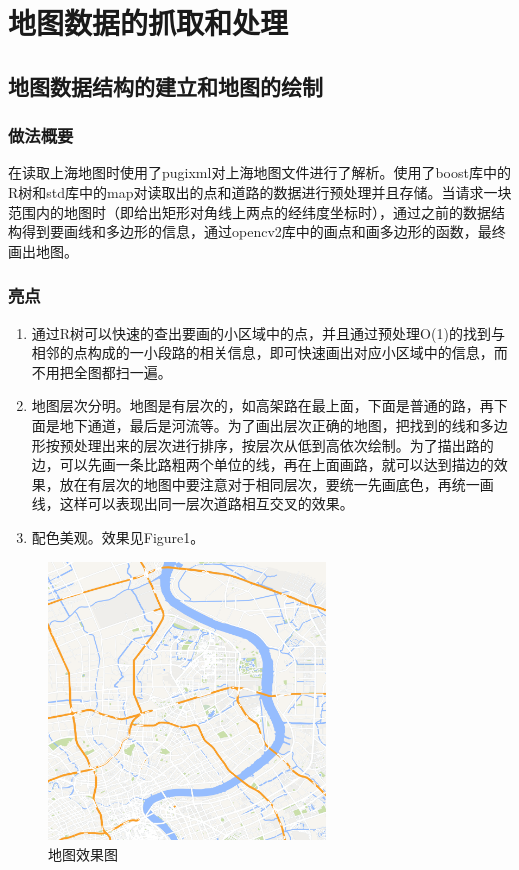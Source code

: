 \documentclass[10pt]{scrartcl}
\begin{document}
\section{地图数据的抓取和处理}
\subsection{地图数据结构的建立和地图的绘制}

\subsubsection{做法概要}
在读取上海地图时使用了pugixml对上海地图文件进行了解析。使用了boost库中的R树和std库中的map对读取出的点和道路的数据进行预处理并且存储。当请求一块范围内的地图时（即给出矩形对角线上两点的经纬度坐标时），通过之前的数据结构得到要画线和多边形的信息，通过opencv2库中的画点和画多边形的函数，最终画出地图。

\subsubsection{亮点}
\begin{enumerate}
\item 通过R树可以快速的查出要画的小区域中的点，并且通过预处理O(1)的找到与相邻的点构成的一小段路的相关信息，即可快速画出对应小区域中的信息，而不用把全图都扫一遍。
\item 地图层次分明。地图是有层次的，如高架路在最上面，下面是普通的路，再下面是地下通道，最后是河流等。为了画出层次正确的地图，把找到的线和多边形按预处理出来的层次进行排序，按层次从低到高依次绘制。为了描出路的边，可以先画一条比路粗两个单位的线，再在上面画路，就可以达到描边的效果，放在有层次的地图中要注意对于相同层次，要统一先画底色，再统一画线，这样可以表现出同一层次道路相互交叉的效果。
\item 配色美观。效果见Figure1。
\end{enumerate}
\begin{figure}[htbp] 
\centering\includegraphics[width=2.9in]{image} 
\caption{地图效果图}\label{fig:1} 
\end{figure} 
\end{document}
